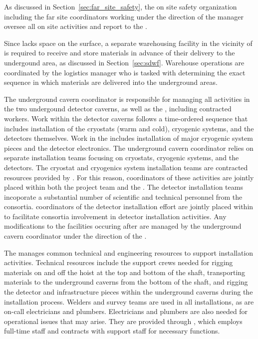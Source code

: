 As discussed in Section~\ref{sec:far_site_safety}, the on site safety
organization including the far site  coordinators
working under the direction of the  
manager oversee all on site activities and report 
to the .

Since  lacks space on the surface, a separate
warehousing facility in the vicinity of  is required to
receive and store materials in advance of their delivery to the
undergound area, as discussed in Section~\ref{sec:sdwf}.  Warehouse
operations are coordinated by the  logistics manager
who is tasked with determining the exact sequence in which materials
are delivered into the underground areas.

The underground cavern coordinator is responsible for managing all 
activities in the two undergound detector caverns, as well as the
, including contracted workers.  Work within the
detector caverns follows a time-ordered sequence that includes
installation of the cryostats (warm and cold), cryogenic systems, and
the detectors themselves.  Work in the  includes
installation of major cryogenic system pieces and the detector
 electronics.  The underground cavern coordinator relies on
separate installation teams focusing on cryostats, cryogenic systems,
and the detectors.  The cryostat and cryogenics system installation
teams are contracted resources provided by .  For this
reason, coordinators of these activities are jointly placed within 
both the  project team and the .  
The detector
installation teams incoporate a substantial number of scientific and
technical personnel from the  consortia.   coordinators 
of the detector installation effort are jointly placed within 
  to facilitate consortia involvement in  
detector installation activities.  Any modifications to the facilities 
occuring after  are managed by the underground cavern 
coordinator under the direction of the .

The  manages common technical and engineering resources to
support installation activities.  Technical resources include the
support crews needed for rigging materials on and off the hoist at the
top and bottom of the shaft, transporting materials to the underground
caverns from the bottom of the shaft, and rigging the detector and
infrastructure pieces within the underground caverns during the
installation process.  
Welders and survey teams are used in all installations, as are on-call electricians and plumbers. Electricians and plumbers are also needed for operational issues that may arise. They are provided through , which employs full-time staff and contracts with support staff for necessary functions.


